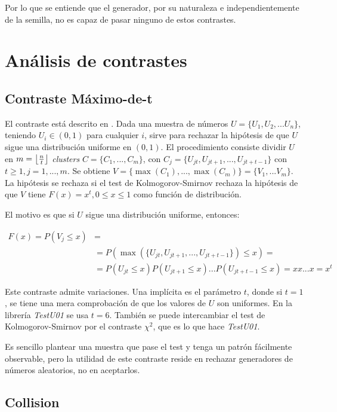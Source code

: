 \documentclass{article}
\DeclarePairedDelimiter\floor{\lfloor}{\rfloor}
\begin{document}
Por lo que se entiende que el generador, por su naturaleza e independientemente de la semilla, no es capaz de pasar ninguno de estos contrastes.

\section{Análisis de contrastes}

\label{sec:anal}

\subsection{Contraste Máximo-de-t}

El contraste está descrito en \citet{knuth2014art}. Dada una muestra de números \(U=\{U_1,U_2,...U_n\}\), teniendo \(U_i \in (0, 1)\) para cualquier \(i\), sirve para rechazar la hipótesis de que \(U\) sigue una distribución uniforme en \((0,1)\). El procedimiento consiste dividir \(U\) en \(m=\floor*{\frac{n}{t}}\) \emph{clusters} \(C=\{C_1,...,C_m\}\), con \(C_j=\{U_{jt},U_{jt+1},...,U_{jt+t-1}\}\) con \(t\ge1, j=1,...,m\). Se obtiene \(V=\{\max(C_1),...,\max(C_m)\}=\{V_1,...V_m\}\). La hipótesis se rechaza si el test de Kolmogorov-Smirnov rechaza la hipótesis de que \(V\) tiene \(F(x)=x^t, 0\le x\le 1\) como función de distribución.

El motivo es que si \(U\) sigue una distribución uniforme, entonces:

\begin{align*}
    F(x)=P(V_j \le x)&=\\
                &=P(\max(\{U_{jt},U_{jt+1},...,U_{jt+t-1}\})\le x)=\\
                &=P(U_{jt}\le x)P(U_{jt+1}\le x)...P(U_{jt+t-1}\le x)=xx...x=x^t
\end{align*}

Este contraste admite variaciones. Una implícita es el parámetro \(t\), donde si \(t=1\), se tiene una mera comprobación de que los valores de \(U\) son uniformes. En la librería \emph{TestU01} se usa \(t=6\). También se puede intercambiar el test de Kolmogorov-Smirnov por el contraste \(\chi^2\), que es lo que hace \emph{TestU01}.

Es sencillo plantear una muestra que pase el test y tenga un patrón fácilmente observable, pero la utilidad de este contraste reside en rechazar generadores de números aleatorios, no en aceptarlos.

\subsection{Collision}
\end{document}
